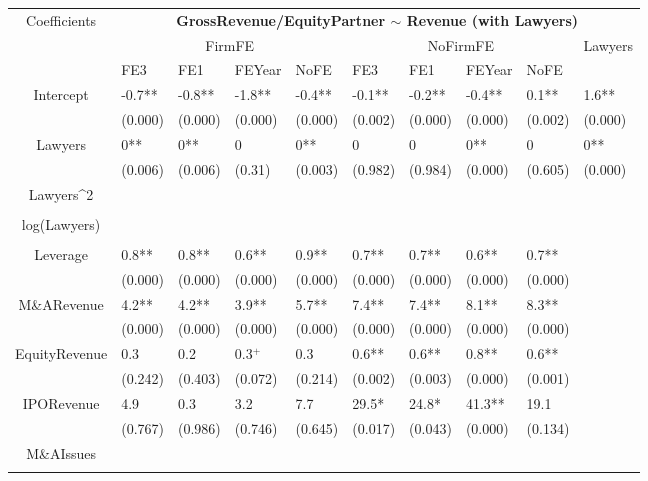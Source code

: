\documentclass{article}
\begin{document}
\begin{table}[H]
\centering
\begin{tabular}{|clllllllll|}
\hline
\multirow{3}{*}{Coefficients} & \multicolumn{9}{c|}{\textbf{GrossRevenue/EquityPartner $\sim$ Revenue (with Lawyers)}} \\
\cline{2-10}
& \multicolumn{4}{c}{FirmFE} & \multicolumn{4}{c}{NoFirmFE} & \multirow{2}{*}{Lawyers} \\
\cline{2-9}
& FE3 & FE1 & FEYear & NoFE & FE3 & FE1 & FEYear & NoFE &  \\
\hline
 
Intercept & -0.7** & -0.8** & -1.8** & -0.4** & -0.1** & -0.2** & -0.4** & 0.1** & 1.6** \\ 
   & (0.000) & (0.000) & (0.000) & (0.000) & (0.002) & (0.000) & (0.000) & (0.002) & (0.000) \\ 
  Lawyers & 0** & 0** & 0 & 0** & 0 & 0 & 0** & 0 & 0** \\ 
   & (0.006) & (0.006) & (0.31) & (0.003) & (0.982) & (0.984) & (0.000) & (0.605) & (0.000) \\ 
  Lawyers^2 &  &  &  &  &  &  &  &  &  \\ 
   &  &  &  &  &  &  &  &  &  \\ 
  log(Lawyers) &  &  &  &  &  &  &  &  &  \\ 
   &  &  &  &  &  &  &  &  &  \\ 
  Leverage & 0.8** & 0.8** & 0.6** & 0.9** & 0.7** & 0.7** & 0.6** & 0.7** &  \\ 
   & (0.000) & (0.000) & (0.000) & (0.000) & (0.000) & (0.000) & (0.000) & (0.000) &  \\ 
  M\&ARevenue & 4.2** & 4.2** & 3.9** & 5.7** & 7.4** & 7.4** & 8.1** & 8.3** &  \\ 
   & (0.000) & (0.000) & (0.000) & (0.000) & (0.000) & (0.000) & (0.000) & (0.000) &  \\ 
  EquityRevenue & 0.3 & 0.2 & 0.3$^{+}$ & 0.3 & 0.6** & 0.6** & 0.8** & 0.6** &  \\ 
   & (0.242) & (0.403) & (0.072) & (0.214) & (0.002) & (0.003) & (0.000) & (0.001) &  \\ 
  IPORevenue & 4.9 & 0.3 & 3.2 & 7.7 & 29.5* & 24.8* & 41.3** & 19.1 &  \\ 
   & (0.767) & (0.986) & (0.746) & (0.645) & (0.017) & (0.043) & (0.000) & (0.134) &  \\ 
  M\&AIssues &  &  &  &  &  &  &  &  &  \\ 
   &  &  &  &  &  &  &  &  &  \\ 

\end{tabular}
\end{table}
\end{document}
